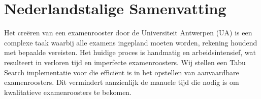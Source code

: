 
\section*{Nederlandstalige Samenvatting}

Het creëren van een examenrooster door de Universiteit Antwerpen (UA) is een complexe taak waarbij alle examens ingepland moeten worden, rekening houdend met bepaalde vereisten. Het huidige proces is handmatig en arbeidsintensief, wat resulteert in verloren tijd en imperfecte examenroosters.
Wij stellen een Tabu Search implementatie voor die efficiënt is in het opstellen van aanvaardbare examenroosters. Dit vermindert aanzienlijk
de manuele tijd die nodig is om kwalitatieve examenroosters te bekomen.
